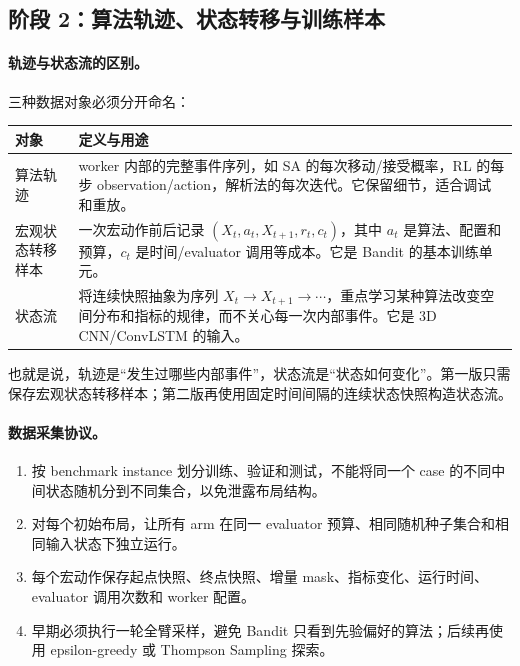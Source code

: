 \documentclass[UTF8,a4paper,11pt]{ctexart}
\begin{document}
\subsection{阶段 2：算法轨迹、状态转移与训练样本}

\paragraph{轨迹与状态流的区别。} 三种数据对象必须分开命名：

\begin{table}[htbp]
\centering
\small
\begin{tabularx}{\textwidth}{p{}X}
\toprule
对象 & 定义与用途 \\
\midrule
算法轨迹 & worker 内部的完整事件序列，如 SA 的每次移动/接受概率，RL 的每步 observation/action，解析法的每次迭代。它保留细节，适合调试和重放。 \\
宏观状态转移样本 & 一次宏动作前后记录 \((X_t,a_t,X_{t+1},r_t,c_t)\)，其中 \(a_t\) 是算法、配置和预算，\(c_t\) 是时间/evaluator 调用等成本。它是 Bandit 的基本训练单元。 \\
状态流 & 将连续快照抽象为序列 \(X_t\rightarrow X_{t+1}\rightarrow\cdots\)，重点学习某种算法改变空间分布和指标的规律，而不关心每一次内部事件。它是 3D CNN/ConvLSTM 的输入。 \\
\bottomrule
\end{tabularx}
\end{table}

也就是说，轨迹是“发生过哪些内部事件”，状态流是“状态如何变化”。第一版只需保存宏观状态转移样本；第二版再使用固定时间间隔的连续状态快照构造状态流。

\paragraph{数据采集协议。}

\begin{enumerate}
    \item 按 benchmark instance 划分训练、验证和测试，不能将同一个 case 的不同中间状态随机分到不同集合，以免泄露布局结构。
    \item 对每个初始布局，让所有 arm 在同一 evaluator 预算、相同随机种子集合和相同输入状态下独立运行。
    \item 每个宏动作保存起点快照、终点快照、增量 mask、指标变化、运行时间、evaluator 调用次数和 worker 配置。
    \item 早期必须执行一轮全臂采样，避免 Bandit 只看到先验偏好的算法；后续再使用 epsilon-greedy 或 Thompson Sampling 探索。
\end{enumerate}
\end{document}
